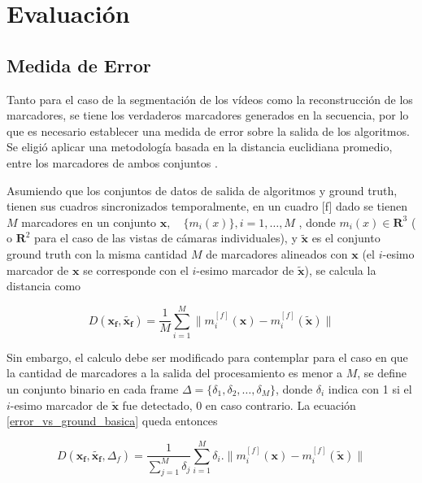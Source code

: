 \section{Evaluación}

\subsection{Medida de Error}

Tanto para el caso de la segmentación de los vídeos como la reconstrucción de los marcadores, se tiene los verdaderos marcadores generados en la secuencia, por lo que es necesario establecer una medida de error sobre la salida de los algoritmos. Se eligió aplicar una metodología basada en la distancia euclidiana promedio, entre los marcadores de ambos conjuntos \cite{humaneva} . 

Asumiendo que los conjuntos de datos de salida de algoritmos y ground truth, tienen sus cuadros sincronizados temporalmente, en un cuadro [f] dado se tienen $M$ marcadores en un conjunto $ \boldsymbol{x},\quad\{m_{i}(x)\},i=1,\ldots,M $ , donde $ m_{i}(x)\in{\mathbf{R}^{3}} $ ( o $ \mathbf{R}^{2} $ para el caso de las vistas de cámaras individuales), y $ \boldsymbol{\tilde{x}} $ es el conjunto ground truth con la misma cantidad $M$ de marcadores alineados con $\boldsymbol{x}$ (el $i$-esimo marcador de $\boldsymbol{x}$ se corresponde con el  $i$-esimo marcador de $\boldsymbol{\tilde{x}}$), se calcula la distancia como

\begin{equation}
D(\boldsymbol{x_{f}},\boldsymbol{\tilde{x_{f}}})=\frac{1}{M}\sum_{i=1}^{M} \|m_{i}^{[f]}(\boldsymbol{x})-m_{i}^{[f]}(\boldsymbol{\tilde{x}})\|
\label{error_vs_ground_basica}
\end{equation}

Sin embargo, el calculo debe ser modificado para contemplar para el caso en que la cantidad de marcadores a la salida del procesamiento es menor a $M$, se define un conjunto binario en cada frame $\Delta=\{\delta_1,\delta_2,\ldots,\delta_M\}$, donde $\delta_i$ indica con 1 si el $i$-esimo marcador de $\boldsymbol{\tilde{x}}$ fue detectado, 0 en caso contrario. La ecuación \ref{error_vs_ground_basica} queda entonces

\begin{equation}
D(\boldsymbol{x_{f}},\boldsymbol{\tilde{x_{f}}},\Delta_{f})=\frac{1}{\sum_{j=1}^{M} \delta_j} \sum_{i=1}^{M} \delta_i.\|m_{i}^{[f]}(\boldsymbol{x})-m_{i}^{[f]}(\boldsymbol{\tilde{x}})\|
\label{error_vs_ground_deteccion}
\end{equation}

